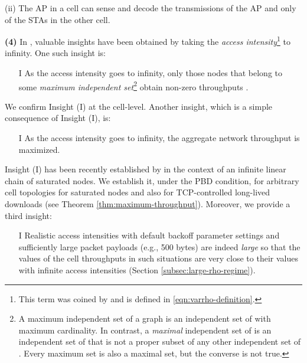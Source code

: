 \documentclass[10pt,a4paper,journal]{IEEEtran}
\theoremstyle{definition}
\theoremstyle{remark}
\theoremstyle{plain}
\begin{document}
\vspace{1mm}

\noindent (ii) The AP in a cell can sense and decode the transmissions of the AP and only  of the STAs in the other cell. 

\vspace{1mm}

\noindent \textbf{(4)} In \cite{wanet.wang-kar05multihop,wanet.durvy09selfOrganization,wanet.liew_etal09ICCback-of-the-envelope}, valuable insights have been obtained by taking the \textit{access intensity}\footnote{This term was coined by \cite{wanet.durvy09selfOrganization} and is defined in \eqref{eqn:varrho-definition}.} to infinity. One such insight is:
\begin{itemize}
\item [I] As the access intensity goes to infinity, only those nodes that belong to some \textit{maximum independent set}\footnote{A maximum independent set of a graph  is an independent set of  with maximum cardinality. In contrast, a \textit{maximal} independent set of  is an independent set of  that is not a proper subset of any other independent set of . Every maximum set is also a maximal set, but the converse is not true.} obtain non-zero throughputs \cite{wanet.wang-kar05multihop,wanet.durvy09selfOrganization,wanet.liew_etal09ICCback-of-the-envelope}.
\end{itemize}
We confirm Insight (I) at the cell-level. Another insight, which is a simple consequence of Insight (I), is: 
\begin{itemize}
\item [I] As the access intensity goes to infinity, the aggregate network throughput is maximized.
\end{itemize} 
Insight (I) has been recently established by \cite{wanet.durvy09selfOrganization} in the context of an infinite linear chain of saturated nodes. We establish it, under the PBD condition, for arbitrary cell topologies for saturated nodes and also for TCP-controlled long-lived downloads (see Theorem \ref{thm:maximum-throughput}). Moreover, we provide a third insight:
\begin{itemize}
\item [I] Realistic access intensities with default backoff parameter settings and sufficiently large packet payloads (e.g.,  500 bytes) are indeed \textit{large} so that the values of the cell throughputs in such situations are very close to their values with infinite access intensities (Section \ref{subsec:large-rho-regime}).
\end{itemize} 
\end{document}
